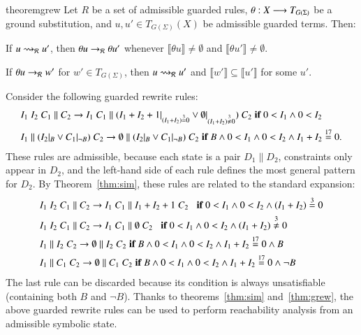 \begin{restatable}{theorem}{grew}
\label{thm:grew}
Let  $R$ be a set of admissible guarded rules, 
$\theta : X \longrightarrow T_{G(\Sigma)}$ be a ground substitution, 
and 
$u, u' \in  T_{G(\Sigma)}(X)$ be admissible guarded terms. Then:
\begin{inparaenum}[(i)]
	\item If $u \rightsquigarrow_{\mathcal{R}} u'$, then $\theta u \to_{\mathcal{R}} \theta u'$
    whenever $\llbracket \theta u \rrbracket \neq \emptyset$ and
    $\llbracket \theta u' \rrbracket \neq \emptyset$.
	\item If $\theta u \to_{\mathcal{R}} w'$ for $w' \in T_{G(\Sigma)}$, then $u
    \rightsquigarrow_{\mathcal{R}} u'$ and $\llbracket w' \rrbracket \subseteq \llbracket
    u' \rrbracket$ for some $u'$.
\end{inparaenum}
\end{restatable}

\begin{example}
Consider the following guarded rewrite rules:
%
\small
\begin{align*}
  &I_1\;I_2\;C_1 \parallel C_2 \rightarrow I_1 \; C_1 \parallel (I_1 + I_2 + 1 |_{(I_1 + I_2) \stackrel{3}{=} 0} \vee \emptyset |_{(I_1 + I_2) \stackrel{3}{\not =} 0} )\;C_2\;\textnormal{\bf if}\; {0 < I_1 \land 0< I_2} 
\\
  &I_1 \parallel (I_2 |_B \vee C_1 |_{\neg B}) \;C_2 \rightarrow \emptyset \parallel (I_2 |_B \vee C_1 |_{\neg B}) \;C_2\;\textnormal{\bf if}\; {B \land 0 < I_1 \land 0< I_2 \land I_1 + I_2 \stackrel{17}{=} 0}.
\end{align*}
\normalsize
%
These rules are admissible, because each state is a pair $D_1
\parallel D_2$, constraints only appear in $D_2$, and the left-hand
side of each rule defines the most general pattern for $D_2$.  By
Theorem~\ref{thm:sim}, these rules are related to the standard
expansion:
%
\small
\begin{align*}
  &I_1\;I_2\;C_1 \parallel C_2 \rightarrow I_1 \; C_1 \parallel I_1 + I_2 + 1\;C_2\;\;\;\textnormal{\bf if}\; {0 < I_1 \land 0< I_2 \land (I_1 + I_2) \stackrel{3}{=} 0} 
\\
  &I_1\;I_2\;C_1 \parallel C_2 \rightarrow I_1 \; C_1 \parallel \emptyset \;C_2\;\;\;\textnormal{\bf if}\; {0 < I_1 \land 0< I_2 \land (I_1 + I_2) \stackrel{3}{\not =} 0} 
\\
  &I_1 \parallel I_2 \;C_2 \rightarrow \emptyset \parallel I_2  \;C_2\;\textnormal{\bf if}\; {B \land 0 < I_1 \land 0< I_2 \land I_1 + I_2 \stackrel{17}{=} 0 \land B} 
\\
  &I_1 \parallel C_1 \;C_2 \rightarrow \emptyset \parallel C_1  \;C_2\;\textnormal{\bf if}\; {B \land 0 < I_1 \land 0< I_2 \land I_1 + I_2 \stackrel{17}{=} 0 \land \neg B}
\end{align*}
\normalsize
%
The last rule can be discarded because its condition is always
unsatisfiable (containing both $B$ and $\neg B$).  Thanks to
theorems~\ref{thm:sim} and~\ref{thm:grew}, the above guarded rewrite rules can be used to
perform reachability analysis from an admissible symbolic state.
\end{example}

